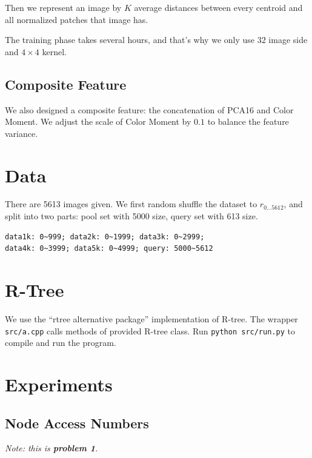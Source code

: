 \documentclass{acm_proc_article-sp}
\begin{document}
Then we represent an image by $K$ average distances between every centroid and
all normalized patches that image has.

The training phase takes several hours, and that's why we only use $32$ image
side and $4\times 4$ kernel.

\subsection{Composite Feature}
We also designed a composite feature: the concatenation of PCA16 and
Color Moment. We adjust the scale of Color Moment by $0.1$ to balance the
feature variance.

\section{Data}

There are 5613 images given. We first random shuffle the dataset to $r_{0\dots
5612}$, and split
into two parts: pool set with 5000 size, query set with 613 size.
\begin{verbatim}data1k: 0~999; data2k: 0~1999; data3k: 0~2999;
data4k: 0~3999; data5k: 0~4999; query: 5000~5612\end{verbatim}

\section{R-Tree}
We use the ``rtree alternative package'' implementation of R-tree.
The wrapper \texttt{src/a.cpp} calls methods of provided R-tree class.
Run \texttt{python src/run.py} to compile and run the program.

\section{Experiments}

\subsection{Node Access Numbers}
\emph{Note: this is \textbf{problem 1}.}
\end{document}
